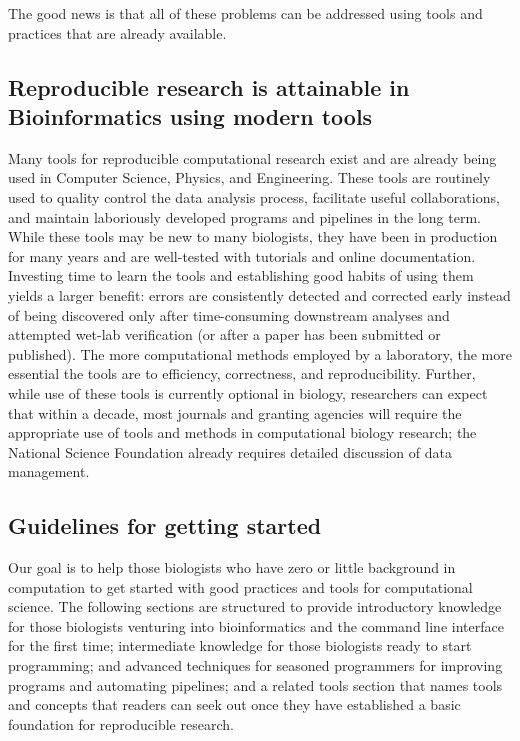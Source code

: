 \documentclass[ChapterTOCs,krantz2]{krantz} %
\begin{document}
The good news is that
all of these problems can be addressed using tools 
and practices that are already available.  

\subsection{Reproducible research is attainable in Bioinformatics using modern tools}

Many tools for reproducible computational research exist and are
already being used in Computer Science, Physics, and
Engineering.  These
tools are routinely used to quality control the data analysis process,
facilitate useful collaborations, and maintain laboriously developed programs
and pipelines in the long term.  While these tools may be new to many
biologists, they have been in production for many years and 
are well-tested with tutorials and online
documentation.  Investing time to learn the
tools and establishing good habits of using them yields a larger benefit:
errors are consistently detected and corrected early instead of being
discovered only after time-consuming downstream analyses and attempted wet-lab
verification (or after a paper has been submitted or published\cite{Miller2006}).  The more
computational methods employed by a laboratory, the more essential the tools
are to efficiency, correctness, and reproducibility.  Further, while 
use of these tools is currently optional in biology\cite{Ince2012}, researchers can 
expect that within a decade, most journals and granting agencies will 
require the appropriate use of tools and methods in computational biology
research; the National Science Foundation already requires detailed
discussion of data management.

\subsection{Guidelines for getting started} Our goal is to help those biologists who
have zero or little background in computation to
get started with good practices and tools for computational science. The following sections are structured to provide
introductory knowledge for those biologists venturing into bioinformatics and the
command line interface for the first time; intermediate knowledge for those
biologists ready to start programming; and advanced techniques for seasoned
programmers for improving programs and automating pipelines; and a related tools
section that names tools and concepts that readers can seek out once they
have established a basic foundation for reproducible research.
\end{document}

